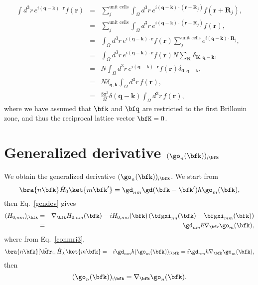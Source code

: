 \begin{eqnarray}\label{a_6}
\int d^{3}r\, e^{i(\mathbf{q}-\mathbf{k})\cdot\mathbf{r}}f(\mathbf{r})
& = &
\sum_{j}^{\mbox{unit cells}}\int_{\Omega}d^{3}r\,
e^{i(\mathbf{q}-\mathbf{k})\cdot(\mathbf{r}+\mathbf{R}_{j})}f(\mathbf{r}+\mathbf{R}_{j}),
\nonumber
\\
 & =&\sum_{j}^{\mbox{unit cells}}\int_{\Omega}d^{3}r\,
 e^{i(\mathbf{q}-\mathbf{k})\cdot(\mathbf{r}+\mathbf{R}_{j})}f(\mathbf{r}),
\nonumber
\\
 & =&\int_{\Omega}d^{3}r\, e^{i(\mathbf{q}-\mathbf{k})\cdot\mathbf{r}}f(\mathbf{r})\sum_{j}^{\mbox{unit cells}}e^{i(\mathbf{q}-\mathbf{k})\cdot\mathbf{R}_{j}},\nonumber
\\
 & =&\int_{\Omega}d^{3}r\, e^{i(\mathbf{q}-\mathbf{k})\cdot\mathbf{r}}f(\mathbf{r})N\sum_{\mathbf{K}}\delta_{\mathbf{K},\mathbf{q}-\mathbf{k}},\nonumber
\\
 & =&N\int_{\Omega}d^{3}r\, e^{i(\mathbf{q}-\mathbf{k})\cdot\mathbf{r}}f(\mathbf{r})\delta_{\mathbf{0},\mathbf{q}-\mathbf{k}},\nonumber
\\
 & =&N\delta_{\mathbf{q},\mathbf{k}}\int_{\Omega}d^{3}r\, f(\mathbf{r}),\nonumber
\\
 &
 =&\frac{8\pi^{3}}{\Omega}\delta(\mathbf{q}-\mathbf{k})\int_{\Omega}d^{3}r\,
 f(\mathbf{r})
,
\end{eqnarray}
where we have assumed that $\bfk$ and $\bfq$ are restricted to the
first Brillouin zone, and thus the reciprocal lattice vector $\bfK=0$.

\section{Generalized derivative $(\go_n(\bfk))_{;\bfk}$}\label{ap_gendevomega}

We obtain the
generalized derivative $(\go_n(\bfk))_{;\bfk}$.
We start from
\begin{equation}\label{a_conH0}
\bra{n\bfk}\hat{H}_0\ket{m\bfk'}=\gd_{nm}\gd(\bfk-\bfk')\hbar\go_m(\bfk)
,
\end{equation}
then Eq.~\eqref{gendev} gives
\begin{eqnarray}\label{a_genderH0}
(H_{0,nm})_{;\bfk}&=&
\nabla_\bfk
H_{0,n m}(\bfk)
-
i
H_{0,nm}(\bfk)
\left(
\bfgxi_{nn}(\bfk)
-
\bfgxi_{mm}(\bfk)
\right)
\nonumber\\
&=&\gd_{nm}\hbar\nabla_\bfk\go_m(\bfk)
,
\end{eqnarray}
where from Eq.~\eqref{conmri3}, 
\begin{eqnarray}\label{a_rih0}
\bra{n\bfk}[\hat\bfr_i,\hat{H}_0]\ket{m\bfk}&=&
i\gd_{nm}\hbar(\go_m(\bfk))_{;\bfk}
=
i\gd_{nm}\hbar\nabla_\bfk\go_m(\bfk)
,
\end{eqnarray}
then
\begin{equation}\label{a_wgendev}
(\go_n(\bfk))_{;\bfk}=
\nabla_\bfk\go_n(\bfk)
.
\end{equation}

